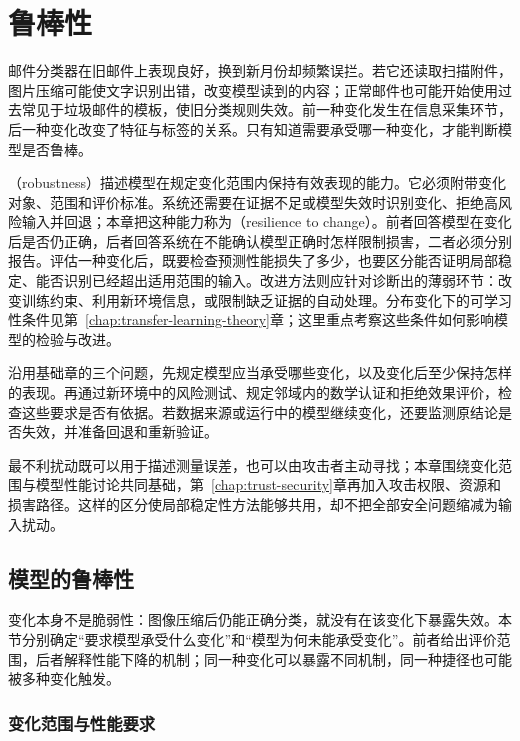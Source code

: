 \chapter{鲁棒性}
\label{chap:trust-robustness}

邮件分类器在旧邮件上表现良好，换到新月份却频繁误拦。若它还读取扫描附件，图片压缩可能使文字识别出错，改变模型读到的内容；正常邮件也可能开始使用过去常见于垃圾邮件的模板，使旧分类规则失效。前一种变化发生在信息采集环节，后一种变化改变了特征与标签的关系。只有知道需要承受哪一种变化，才能判断模型是否鲁棒。

（robustness）描述模型在规定变化范围内保持有效表现的能力。它必须附带变化对象、范围和评价标准。系统还需要在证据不足或模型失效时识别变化、拒绝高风险输入并回退；本章把这种能力称为（resilience to change）。前者回答模型在变化后是否仍正确，后者回答系统在不能确认模型正确时怎样限制损害，二者必须分别报告。评估一种变化后，既要检查预测性能损失了多少，也要区分能否证明局部稳定、能否识别已经超出适用范围的输入。改进方法则应针对诊断出的薄弱环节：改变训练约束、利用新环境信息，或限制缺乏证据的自动处理。分布变化下的可学习性条件见第~\ref{chap:transfer-learning-theory}章；这里重点考察这些条件如何影响模型的检验与改进。

沿用基础章的三个问题，先规定模型应当承受哪些变化，以及变化后至少保持怎样的表现。再通过新环境中的风险测试、规定邻域内的数学认证和拒绝效果评价，检查这些要求是否有依据。若数据来源或运行中的模型继续变化，还要监测原结论是否失效，并准备回退和重新验证。

最不利扰动既可以用于描述测量误差，也可以由攻击者主动寻找；本章围绕变化范围与模型性能讨论共同基础，第~\ref{chap:trust-security}章再加入攻击权限、资源和损害路径。这样的区分使局部稳定性方法能够共用，却不把全部安全问题缩减为输入扰动。

\section{模型的鲁棒性}
\label{sec:robustness-fragility}

变化本身不是脆弱性：图像压缩后仍能正确分类，就没有在该变化下暴露失效。本节分别确定“要求模型承受什么变化”和“模型为何未能承受变化”。前者给出评价范围，后者解释性能下降的机制；同一种变化可以暴露不同机制，同一种捷径也可能被多种变化触发。

\subsection{变化范围与性能要求}
\label{sec:robustness-change-scope}

